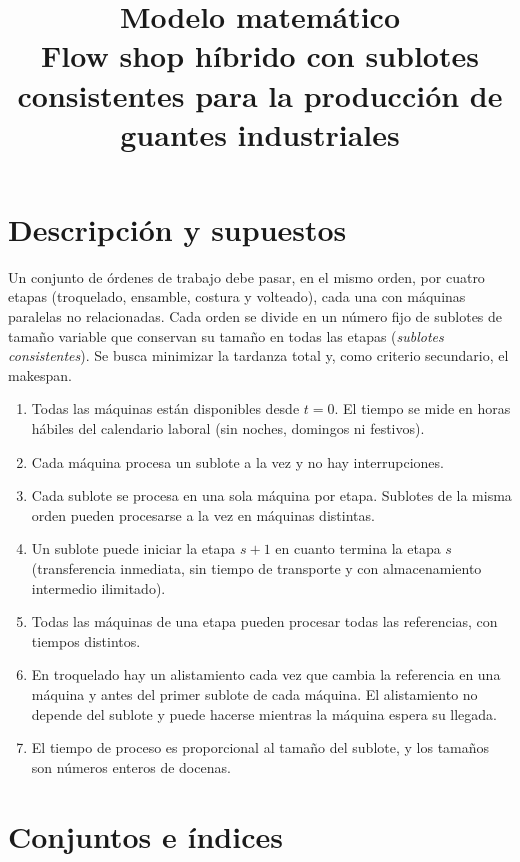\documentclass[11pt,a4paper]{article}
\title{Modelo matemático\\[2pt]
\large Flow shop híbrido con sublotes consistentes para la producción de guantes industriales}
\date{}
\begin{document}
\maketitle

\section{Descripción y supuestos}

Un conjunto de órdenes de trabajo debe pasar, en el mismo orden, por cuatro
etapas (troquelado, ensamble, costura y volteado), cada una con máquinas
paralelas no relacionadas. Cada orden se divide en un número fijo de sublotes
de tamaño variable que conservan su tamaño en todas las etapas
(\emph{sublotes consistentes}). Se busca minimizar la tardanza total y, como
criterio secundario, el makespan.

\begin{enumerate}
  \item Todas las máquinas están disponibles desde $t=0$. El tiempo se mide en
        horas hábiles del calendario laboral (sin noches, domingos ni festivos).
  \item Cada máquina procesa un sublote a la vez y no hay interrupciones.
  \item Cada sublote se procesa en una sola máquina por etapa. Sublotes de la
        misma orden pueden procesarse a la vez en máquinas distintas.
  \item Un sublote puede iniciar la etapa $s+1$ en cuanto termina la etapa $s$
        (transferencia inmediata, sin tiempo de transporte y con almacenamiento
        intermedio ilimitado).
  \item Todas las máquinas de una etapa pueden procesar todas las referencias,
        con tiempos distintos.
  \item En troquelado hay un alistamiento cada vez que cambia la referencia en
        una máquina y antes del primer sublote de cada máquina. El alistamiento
        no depende del sublote y puede hacerse mientras la máquina espera
        su llegada.
  \item El tiempo de proceso es proporcional al tamaño del sublote, y los
        tamaños son números enteros de docenas.
\end{enumerate}

\section{Conjuntos e índices}
\end{document}
